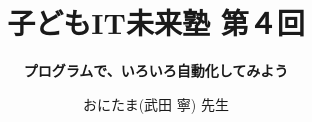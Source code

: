 \title{\Huge\bf 子どもIT未来塾 第４回}
\author{
\huge\bf プログラムで、いろいろ自動化してみよう
\vspace{15mm}
}
\date{ \Huge おにたま(武田 寧) 先生 }
